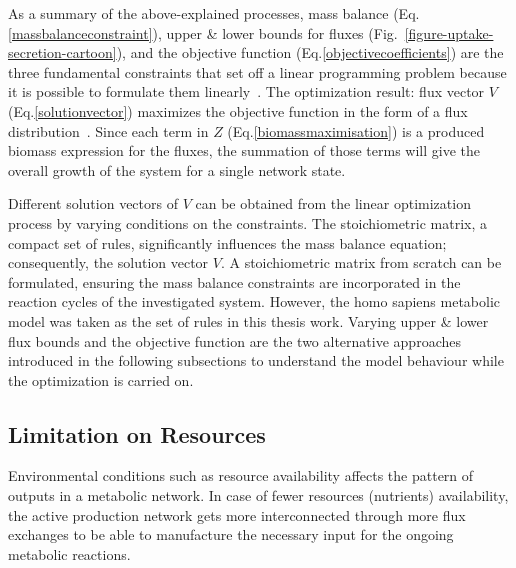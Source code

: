 

As a summary of the above-explained processes, mass balance (Eq.\eqref{massbalanceconstraint}), upper \& lower bounds for fluxes (Fig.~\ref{figure-uptake-secretion-cartoon}), and the objective function (Eq.\eqref{objectivecoefficients}) are the three fundamental constraints that set off a linear programming problem because it is possible to formulate them linearly~\cite{PRICE2004}. The optimization result: flux vector $V$ (Eq.\eqref{solutionvector}) maximizes the objective function in the form of a flux distribution~\cite{KAUFFMAN2003491,PRICE2004}. Since each term in $Z$ (Eq.\eqref{biomassmaximisation}) is a produced biomass expression for the fluxes, the summation of those terms will give the overall growth of the system for a single network state.

Different solution vectors of $V$ can be obtained from the linear optimization process by varying conditions on the constraints. The stoichiometric matrix, a compact set of rules, significantly influences the mass balance equation; consequently, the solution vector $V$. A stoichiometric matrix from scratch can be formulated, ensuring the mass balance constraints are incorporated in the reaction cycles of the investigated system. However, the homo sapiens metabolic model was taken as the set of rules in this thesis work. Varying upper \& lower flux bounds and the objective function are the two alternative approaches introduced in the following subsections to understand the model behaviour while the optimization is carried on.
\subsection*{Limitation on Resources}
%
Environmental conditions such as resource availability affects the pattern of outputs in a metabolic network. In case of fewer resources (nutrients) availability, the active production network gets more interconnected through more flux exchanges to be able to manufacture the necessary input for the ongoing metabolic reactions.~\cite{PRICE2004,MAHADEVAN2003,Reed01092004,BURGARD2001}

